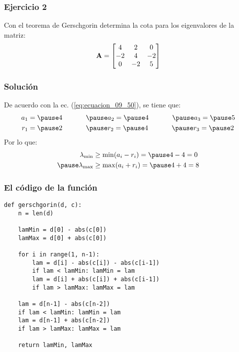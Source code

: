 \documentclass[12pt]{beamer}
\begin{document}
\begin{frame}
\frametitle{Ejercicio 2}
Con el teorema de Gerschgorin determina la cota para los eigenvalores de la matriz:
\pause
\begin{align*}
\vb{A} = 
\begin{bmatrix}
4 & 2 & 0 \\
-2 & 4 & -2 \\
0 & -2 & 5
\end{bmatrix}
\end{align*}
\end{frame}
\begin{frame}
\frametitle{Solución}
De acuerdo con la ec. (\ref{eq:ecuacion_09_50}), se tiene que:
\pause
\begin{eqnarray*}
\begin{aligned}
a_{1} &= \pause 4 \hspace{1.2cm} \pause a_{2} = \pause 4 \hspace{1.2cm} \pause a_{3} = \pause 5 \\
r_{1} &= \pause 2 \hspace{1.2cm} \pause r_{2} = \pause 4 \hspace{1.2cm} \pause r_{3} = \pause 2
\end{aligned}
\end{eqnarray*}
\pause
Por lo que:
\pause
\begin{eqnarray*}
\begin{aligned}
\lambda_{\min} &\geq \min (a_{i} - r_{i}) = \pause 4 - 4 = 0 \\ \pause
\lambda_{\max} &\geq \max (a_{i} + r_{i}) = \pause 4 + 4 = 8
\end{aligned}
\end{eqnarray*}
\end{frame}
\begin{frame}
\frametitle{El código de la función}
\begin{lstlisting}[caption=Función para establecer los paréntesis de los eigenvalores]
def gerschgorin(d, c):
    n = len(d)
    
    lamMin = d[0] - abs(c[0])
    lamMax = d[0] + abs(c[0])
    
    for i in range(1, n-1):
        lam = d[i] - abs(c[i]) - abs(c[i-1])
        if lam < lamMin: lamMin = lam
        lam = d[i] + abs(c[i]) + abs(c[i-1])
        if lam > lamMax: lamMax = lam
        
    lam = d[n-1] - abs(c[n-2])
    if lam < lamMin: lamMin = lam
    lam = d[n-1] + abs(c[n-2])
    if lam > lamMax: lamMax = lam
    
    return lamMin, lamMax
\end{lstlisting}
\end{frame}
\end{document}
